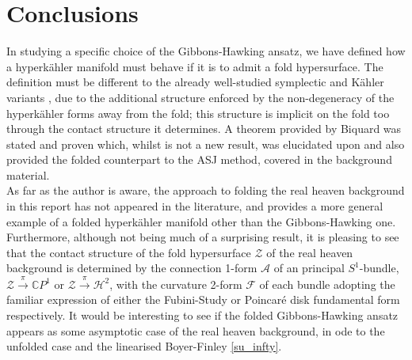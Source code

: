 \documentclass[a4paper,12pt, onecolumn, notitlepage]{article}
\theoremstyle{definition}
\theoremstyle{remark}
\newcommand{\K}{K\"ahler }
\newcommand{\HK}{hyperk\"ahler }
\begin{document}
\section{Conclusions}
In studying a specific choice of the Gibbons-Hawking ansatz, we have defined how a \HK manifold must behave if it is to admit a fold hypersurface. The definition must be different to the already well-studied symplectic and \K variants \cite{dasilva_2000, baykur_2006}, due to the additional structure enforced by the non-degeneracy of the \HK forms away from the fold; this structure is implicit on the fold too through the contact structure it determines. A theorem provided by Biquard \cite{biquard_2015} was stated and proven which, whilst is not a new result, was elucidated upon and also provided the folded counterpart to the ASJ method, covered in the background material.\\
As far as the author is aware, the approach to folding the real heaven background in this report has not appeared in the literature, and provides a more general example of a folded \HK manifold other than the Gibbons-Hawking one. Furthermore, although not being much of a surprising result, it is pleasing to see that the contact structure of the fold hypersurface $\mathcal{Z}$ of the real heaven background is determined by the connection 1-form $\mathcal{A}$ of an principal $S^{1}$-bundle, $\mathcal{Z}\overset{\pi}{\rightarrow}\mathbb{C}P^{1}$ or $\mathcal{Z}\overset{\pi}{\rightarrow}\mathcal{H}^{2}$, with the curvature 2-form $\mathcal{F}$ of each bundle adopting the familiar expression of either the Fubini-Study or Poincar\'e disk fundamental form respectively. It would be interesting to see if the folded Gibbons-Hawking ansatz appears as some asymptotic case of the real heaven background, in ode to the unfolded case and the linearised Boyer-Finley \cref{su_infty}.


 

	
\end{document}
